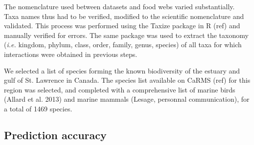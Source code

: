 \documentclass[letterpaper]{article}
\begin{document}
The nomenclature used between datasets and food webs varied substantially. Taxa names thus had to be verified, modified to the scientific nomenclature and validated. This process was performed using the Taxize package in R (ref) and manually verified for errors. The same package was used to extract the taxonomy (\textit{i.e.} kingdom, phylum, class, order, family, genus, species) of all taxa for which interactions were obtained in previous steps.

We selected a list of species forming the known biodiversity of the estuary and gulf of St. Lawrence in Canada. The species list available on CaRMS (ref) for this region was selected, and completed with a comprehensive list of marine birds (Allard et al. 2013) and marine mammals (Lesage, personnal communication), for a total of 1469 species.

\subsection{Prediction accuracy}
\end{document}
